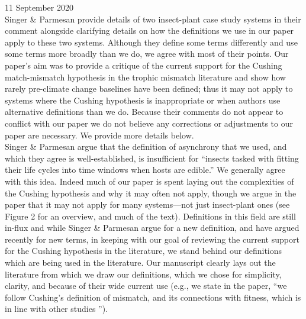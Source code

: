 \documentclass[11pt,letter]{article}
\begin{document}

\renewcommand{\refname}{\CHead{}}

11 September 2020\\

Singer \& Parmesan provide details of two insect-plant case study systems in their comment alongside clarifying details on how the definitions we use in our paper apply to these two systems. Although they define some terms differently and use some terms more broadly than we do, we agree with most of their points. Our paper's aim was to provide a critique of the current support for the Cushing match-mismatch hypothesis in the trophic mismatch literature and show how rarely pre-climate change baselines have been defined; thus it may not apply to systems where the Cushing hypothesis is inappropriate or when authors use alternative definitions than we do. Because their comments do not appear to conflict with our paper we do not believe any corrections or adjustments to our paper are necessary.  We provide more details below.\\

Singer \& Parmesan argue that the definition of asynchrony that we used, and which they agree is well-established, is insufficient for ``insects tasked with fitting their life cycles into time windows when hosts are edible.''  We generally agree with this idea. Indeed much of our paper is spent laying out the complexities of the Cushing hypothesis and why it may often not apply, though we argue in the paper that it may not apply for many systems---not just insect-plant ones (see Figure 2 for an overview, and much of the text). Definitions in this field are still in-flux and while Singer \& Parmesan argue for a new definition, and \citet{vissergienapp2019} have argued recently for new terms, in keeping with our goal of reviewing the current support for the Cushing hypothesis in the literature, we stand behind our definitions which are being used in the literature. Our manuscript clearly lays out the literature from which we draw our definitions, which we chose for simplicity, clarity, and because of their wide current use (e.g., we state in the paper, ``we follow Cushing's definition of mismatch, and its connections with fitness, which is in line with other studies \citep{Johansson2015,durant2007,kerby2012}''). \\
\end{document}
